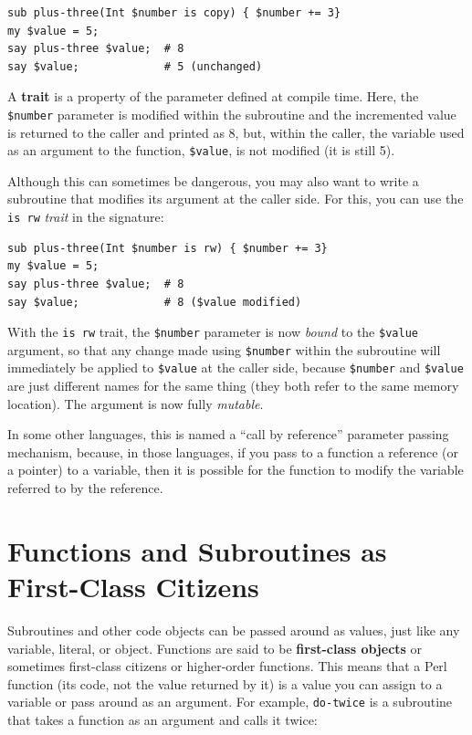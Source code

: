\begin{verbatim}
sub plus-three(Int $number is copy) { $number += 3}
my $value = 5;
say plus-three $value;  # 8
say $value;             # 5 (unchanged)
\end{verbatim}
%
A {\bf trait} is a property of the parameter defined at compile time. 
Here, the {\tt \$number} parameter is modified within the 
subroutine and the incremented value is returned to the caller 
and printed as 8, but, within the caller, the variable used
as an argument to the function, {\tt \$value}, is not 
modified (it is still 5).

Although this can sometimes be dangerous, you may also want 
to write a subroutine that modifies its argument at the caller 
side. For this, you can use the {\tt is rw} \emph{trait} 
in the signature:

\begin{verbatim}
sub plus-three(Int $number is rw) { $number += 3}
my $value = 5;
say plus-three $value;  # 8
say $value;             # 8 ($value modified)
\end{verbatim}
%
With the {\tt is rw} trait, the {\tt \$number} parameter is 
now  \emph{bound} to the {\tt \$value} argument, so that any change 
made using {\tt \$number} within the subroutine will immediately 
be applied to {\tt \$value} at the caller side, because {\tt \$number} 
and {\tt \$value} are just different names for the same thing (they 
both refer to the same memory location). The argument is now 
fully \emph{mutable}.

In some other languages, this is named a ``call by reference'' 
parameter passing mechanism, because, in those languages, if you 
pass to a function  a reference (or a pointer) to a variable, then 
it is possible for the function to modify the variable referred 
to by the reference.


\section{Functions and Subroutines as First-Class Citizens}
\label{first_class}

Subroutines and other code objects can be passed around as values, 
just like any variable, literal, or object. Functions are said 
to be {\bf first-class objects} or sometimes first-class 
citizens or higher-order functions. This means that a Perl 
function (its code, not the value returned by it) is a value 
you can assign to a variable or pass around as an argument. 
For example, \verb"do-twice" is a subroutine that takes a 
function as an argument and calls it twice:

